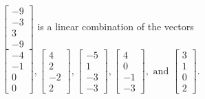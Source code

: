 \begin{exercise}
\begin{exerciseStatement}
  \end{exerciseStatement}
  \begin{exerciseAnswer}
   \(\left[\begin{array}{c}
-9 \\
-3 \\
3 \\
-9
\end{array}\right]\) 
  	 is  
	a linear combination of the vectors \(\left[\begin{array}{c}
-4 \\
-1 \\
0 \\
0
\end{array}\right] , \left[\begin{array}{c}
4 \\
2 \\
-2 \\
2
\end{array}\right] , \left[\begin{array}{c}
-5 \\
1 \\
-3 \\
-3
\end{array}\right] , \left[\begin{array}{c}
4 \\
0 \\
-1 \\
-3
\end{array}\right] , \text{ and } \left[\begin{array}{c}
3 \\
1 \\
0 \\
2
\end{array}\right]\).

	
  


  \end{exerciseAnswer}
\end{exercise}